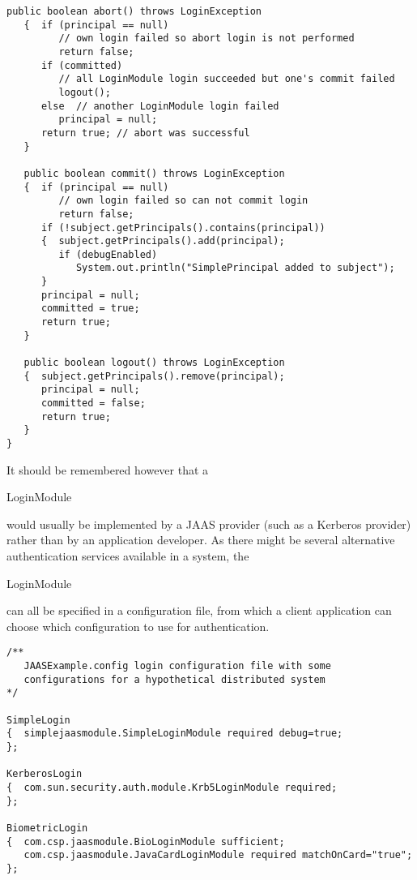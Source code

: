 \begin{lstlisting}[caption=JAAS Login]
   public boolean abort() throws LoginException
   {  if (principal == null)
         // own login failed so abort login is not performed
         return false;
      if (committed)
         // all LoginModule login succeeded but one's commit failed
         logout();
      else  // another LoginModule login failed
         principal = null;
      return true; // abort was successful
   }

   public boolean commit() throws LoginException
   {  if (principal == null)
         // own login failed so can not commit login
         return false;
      if (!subject.getPrincipals().contains(principal))
      {  subject.getPrincipals().add(principal);
         if (debugEnabled)
            System.out.println("SimplePrincipal added to subject");
      }
      principal = null;
      committed = true;
      return true;
   }

   public boolean logout() throws LoginException
   {  subject.getPrincipals().remove(principal);
      principal = null;
      committed = false;
      return true;
   }
}
\end{lstlisting}
It should be remembered however that a \begin{code}LoginModule\end{code}
would usually be implemented by a JAAS provider (such as a Kerberos provider)
rather than by an application developer.
As there might be several alternative authentication services available in a system,
the \begin{code}LoginModule\end{code} can all be specified in a configuration file,
from which a client application can choose which configuration to use
for authentication.

\begin{lstlisting}[caption=JAAS login configuration]
/**
   JAASExample.config login configuration file with some
   configurations for a hypothetical distributed system
*/

SimpleLogin
{  simplejaasmodule.SimpleLoginModule required debug=true;
};

KerberosLogin
{  com.sun.security.auth.module.Krb5LoginModule required;
};

BiometricLogin
{  com.csp.jaasmodule.BioLoginModule sufficient;
   com.csp.jaasmodule.JavaCardLoginModule required matchOnCard="true";
};
\end{lstlisting}


